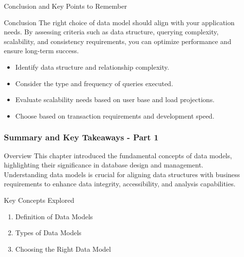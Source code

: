 \documentclass[aspectratio=169]{beamer}
\begin{document}
\begin{frame}[fragile]{Conclusion and Key Points to Remember}
    \begin{block}{Conclusion}
        The right choice of data model should align with your application needs. By assessing criteria such as data structure, querying complexity, scalability, and consistency requirements, you can optimize performance and ensure long-term success.
    \end{block}
    
    \begin{itemize}
        \item Identify data structure and relationship complexity.
        \item Consider the type and frequency of queries executed.
        \item Evaluate scalability needs based on user base and load projections.
        \item Choose based on transaction requirements and development speed.
    \end{itemize}
\end{frame}

\begin{frame}[fragile]
    \frametitle{Summary and Key Takeaways - Part 1}
    \begin{block}{Overview}
        This chapter introduced the fundamental concepts of data models, highlighting their significance in database design and management. Understanding data models is crucial for aligning data structures with business requirements to enhance data integrity, accessibility, and analysis capabilities.
    \end{block}
    
    \begin{block}{Key Concepts Explored}
        \begin{enumerate}
            \item Definition of Data Models
            \item Types of Data Models
            \item Choosing the Right Data Model
        \end{enumerate}
    \end{block}
\end{frame}
\end{document}
